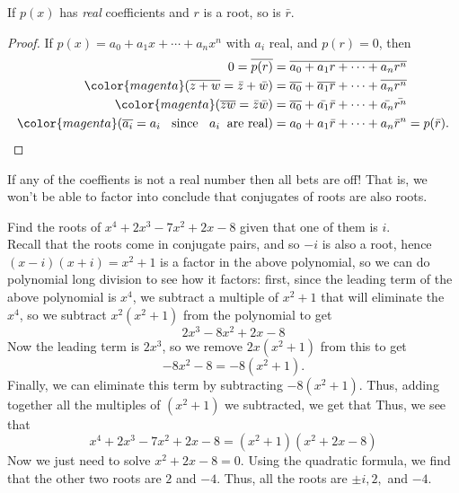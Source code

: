 \documentclass[11pt,dvipsnames]{book}
\numberwithin{figure}{section} %
\numberwithin{table}{section} %
\begin{document}
\begin{theorem} If $p(x)$ has {\it real} coefficients and $r$ is a root, so is $\bar{r}$.
\end{theorem}

\begin{proof}
If $p(x)=a_0+a_{1}x+\cdots +a_{n}x^n$ with $a_{i}$ real, and $p(r)=0$, then
\begin{align*}
0 =\overline{p(r)}
 & =\overline{a_0+a_{1}r+\cdots +a_{n}r^n} \\
{\color{magenta} (\overline{z+w}=\bar{z}+\bar{w})} & = \overline{a_0}+\overline{a_1 r}+\cdots + \overline{ a_n r^n} \\
{\color{magenta} (\overline{zw}=\bar{z}\bar{w})} & =\overline{a_0}+\bar{a_1} \bar{ r}+\cdots + \bar{ a_n}\bar{ r^n} \\
{\color{magenta} (\overline{a_{i}}=a_{i}\;\; \mbox{ since }\;\;a_{i} \;\; \mbox{are real})} &  ={a_0}+{a_1} \bar{ r}+\cdots + { a_n}\bar{ r}^n = p(\bar{r}).
\end{align*}

\end{proof}


 If any of the coeffients is not a real number then all bets are off! That is, we won't be able to factor into conclude that conjugates of roots are also roots. \\

\begin{example}
Find the roots of $x^4+2x^3-7x^2+2x-8$ given that one of them is $i$. \\

Recall that the roots come in conjugate pairs, and so $-i$ is also a root, hence $(x-i)(x+i)=x^2+1$ is a factor in the above polynomial, so we can do polynomial long division to see how it factors: first, since the leading term of the above polynomial is $x^4$, we subtract a multiple of $x^2+1$ that will eliminate the $x^4$, so we subtract $x^2(x^2+1)$ from the polynomial to get
\[
2x^3-8x^2+2x-8\]
Now the leading term is $2x^3$, so we remove $2x(x^2+1)$ from this to get
\[
-8x^2-8=-8(x^2+1).
\]
Finally, we can eliminate this term by subtracting $-8(x^2+1)$. Thus, adding together all the multiples of $(x^2+1)$ we subtracted, we get that
Thus, we see that
\[
x^4+2x^3-7x^2+2x-8=(x^2+1)(x^2+2x-8)
\]
Now we just need to solve $x^2+2x-8=0$. Using the quadratic formula, we find that the other two roots are $2$ and $-4$. Thus, all the roots are $\pm i, 2,$ and $-4$.
\end{example}
\end{document}
